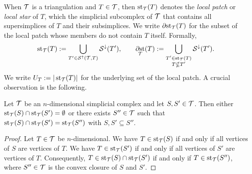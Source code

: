\documentclass[12pt,a4paper]{article}
\begin{document}
When ${\mathcal T}$ is a triangulation and $T \in {\mathcal T}$, then $\operatorname{st}_{{\mathcal T}}(T)$ denotes the \emph{local patch} or \textit{local star} of $T$, 
which the simplicial subcomplex of ${\mathcal T}$ that contains all supersimplices of $T$ and their subsimplices. 
We write $\operatorname*{{\partial \rm st}}_{{\mathcal T}}(T)$ for the subset of the local patch whose members do not contain $T$ itself. 
Formally,
\begin{gather*}
    \operatorname{st}_{{\mathcal T}}(T) := \bigcup_{ T' \in {\mathcal S}^{\uparrow}({\mathcal T},T) } {\mathcal S}^{\downarrow}(T'),
    \qquad 
    \operatorname*{{\partial \rm st}}_{{\mathcal T}}(T) := \bigcup_{ \substack{ T' \in \operatorname{st}_{{\mathcal T}}(T) \\ T \nsubseteq T' } } {\mathcal S}^{\downarrow}(T').
\end{gather*}
We write $U_T := | \operatorname{st}_{{\mathcal T}}(T) |$ for the underlying set of the local patch. 
A crucial observation is the following.  

\begin{lemma}
 Let ${\mathcal T}$ be an $n$-dimensional simplicial complex and let $S,S' \in {\mathcal T}$.
 Then either $\operatorname{st}_{{\mathcal T}}(S) \cap \operatorname{st}_{{\mathcal T}}(S') = \emptyset$ or there exists $S'' \in {\mathcal T}$
 such that $\operatorname{st}_{{\mathcal T}}(S) \cap \operatorname{st}_{{\mathcal T}}(S') = \operatorname{st}_{{\mathcal T}}(S'')$ with $S, S' \subseteq S''$.
\end{lemma}
\begin{proof}
 Let $T \in {\mathcal T}$ be $n$-dimensional.
 We have $T \in \operatorname{st}_{{\mathcal T}}(S )$ if and only if all vertices of $S $ are vertices of $T$.
 We have $T \in \operatorname{st}_{{\mathcal T}}(S')$ if and only if all vertices of $S'$ are vertices of $T$.
 Consequently, $T \in \operatorname{st}_{{\mathcal T}}(S) \cap \operatorname{st}_{{\mathcal T}}(S')$ if and only if $T \in \operatorname{st}_{{\mathcal T}}(S'')$,
 where $S'' \in {\mathcal T}$ is the convex closure of $S$ and $S'$.
\end{proof}
\end{document}
